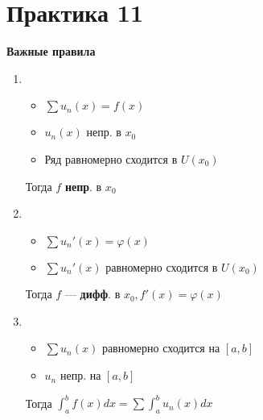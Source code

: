 \section*{Практика 11}

\textbf{Важные правила}
\begin{enumerate}
    \item \begin{itemize}
              \item \(\sum u_n(x) = f(x)\)
              \item \(u_n(x)\) непр. в \(x_0\)
              \item Ряд равномерно сходится в \(U(x_0)\)
          \end{itemize}
          Тогда \(f\) \textbf{непр}. в \(x_0\)
    \item \begin{itemize}
              \item \(\sum u_n'(x) = \varphi(x)\)
              \item \(\sum u_n'(x)\) равномерно сходится в \(U(x_0)\)
          \end{itemize}
          Тогда \(f\) --- \textbf{дифф}. в \(x_0, f'(x) = \varphi(x)\)
    \item \begin{itemize}
              \item \(\sum u_n(x) \) равномерно сходится на \([a, b]\)
              \item \(u_n\) непр. на \([a, b]\)
          \end{itemize}
          Тогда \(\int_a^b f(x)dx = \sum \int_a^b u_n(x) dx\)
\end{enumerate}

